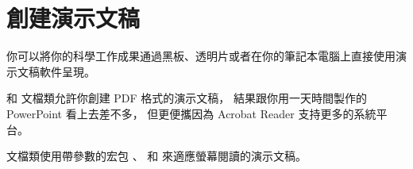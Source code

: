 \section{創建演示文稿}
\label{sec:beamer} 


你可以將你的科學工作成果通過黑板、透明片或者在你的筆記本電腦上直接使用演示文稿軟件呈現。


 和  文檔類允許你創建 PDF 格式的演示文稿，
結果跟你用一天時間製作的 PowerPoint 看上去差不多，
但更便攜因為 Acrobat Reader 支持更多的系統平台。



 文檔類使用帶參數的宏包 、  和  來適應螢幕閱讀的演示文稿。



